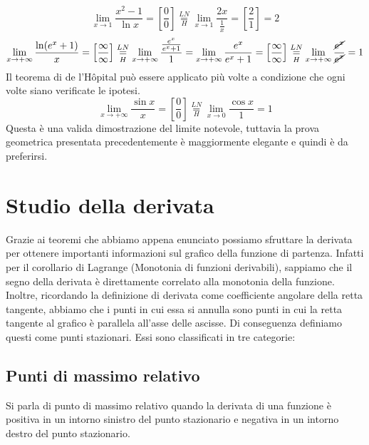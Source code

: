     \begin{ex}
        \begin{tasks}
            \task \[\lim_{x\to 1}\frac{x^2-1}{\ln x}=\left[ \frac{0}{0} \right]\overset{LN}{\underset{H}=}\lim_{x\to 1}\frac{2x}{\frac{1}{x}}=\left[ \frac{2}{1} \right]=2\]
            \task \[\lim_{x\to +\infty}\frac{\ln(e^x+1)}{x}=\left[ \frac{\infty}{\infty} \right]\overset{LN}{\underset{H}=}\lim_{x\to +\infty}\frac{\frac{e^x}{e^x+1}}{1}=\lim_{x\to +\infty}\frac{e^x}{e^x+1}=\left[ \frac{\infty}{\infty} \right]\overset{LN}{\underset{H}=} \lim_{x\to+\infty}\frac{\cancel{e^x}}{\cancel{e^x}}=1\]
            Il teorema di de l'Hôpital può essere applicato più volte a condizione che ogni volte siano verificate le ipotesi.
            \task \[\lim_{x\to +\infty}\frac{\sin x}{x}= \left[ \frac{0}{0} \right]\overset{LN}{\underset{H}=}\lim_{x\to 0}\frac{\cos x}{1}=1\]
            Questa è una valida dimostrazione del limite notevole, tuttavia la prova geometrica presentata precedentemente è maggiormente elegante e quindi è da preferirsi.
        \end{tasks}
        
    \end{ex}
\section{Studio della derivata}
Grazie ai teoremi che abbiamo appena enunciato possiamo sfruttare la derivata per ottenere importanti informazioni sul grafico della funzione di partenza. Infatti per il corollario di Lagrange (Monotonia di funzioni derivabili), sappiamo che il segno della derivata è direttamente correlato alla monotonia della funzione. Inoltre, ricordando la definizione di derivata come coefficiente angolare della retta tangente, abbiamo che i punti in cui essa si annulla sono punti in cui la retta tangente al grafico è parallela all'asse delle ascisse. Di conseguenza definiamo questi come punti stazionari. Essi sono classificati in tre categorie: 
\subsection{Punti di massimo relativo}
Si parla di punto di massimo relativo quando la derivata di una funzione è positiva in un intorno sinistro del punto stazionario e negativa in un intorno destro del punto stazionario.
